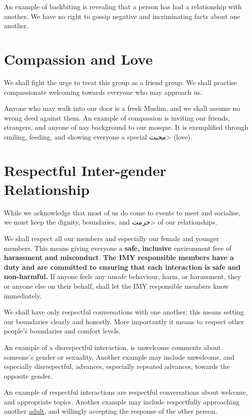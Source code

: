 \documentclass{article}
\begin{document}
An example of backbiting is revealing that a person has had a relationship with another.
We have no right to gossip negative and incriminating facts about one another.

\section{Compassion and Love}
We shall fight the urge to treat this group as a friend group.
We shall practise compassionate welcoming towards everyone who may approach us.

Anyone who may walk into our door is a fresh Muslim, and we shall assume no wrong deed against them.
An example of compassion is inviting our friends, strangers, and anyone of nay background to our mosque.
It is exemplified through smiling, feeding, and showing everyone a special \<محبت> (love).

\section{Respectful Inter-gender Relationship}
While we acknowledge that most of us do come to events to meet and socialise, we must keep the dignity, boundaries, and \<حرمت> of our relationships.

We shall respect all our members and especially our female and younger members.
This means giving everyone a \textbf{safe, inclusive} environment free of \textbf{harassment and misconduct}.
\textbf{The IMY responsible members have a duty and are committed to ensuring that each interaction is safe and non-harmful. }
If anyone feels any unsafe behaviour, harm, or harassment, they or anyone else on their behalf, shall let the IMY responsible members know immediately.

We shall have only respectful conversations with one another; this means setting our boundaries clearly and honestly.
More importantly it means to respect other people's boundaries and comfort levels.

An example of a disrespectful interaction, is unwelcome comments about someone's gender or sexuality.
Another example may include unwelcome, and especially disrespectful, advances, especially repeated advances, towards the opposite gender.

An example of respectful interactions are respectful conversations about welcome, and appropriate topics.
Another example may include respectfully approaching another \underline{adult}, and willingly accepting the response of the other person.
\end{document}
